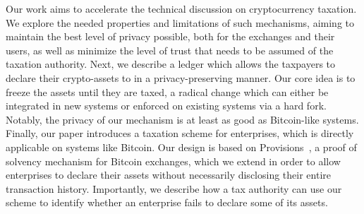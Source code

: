 Our work aims to accelerate the technical discussion on cryptocurrency
taxation.  We explore the needed properties and limitations of such mechanisms,
aiming to maintain the best level of privacy possible, both for the exchanges
and their users, as well as minimize the level of trust that needs to be
assumed of the taxation authority. Next, we describe a ledger which allows
the taxpayers to declare their crypto-assets to in a
privacy-preserving manner. Our core idea is to freeze the assets until they are
taxed, a radical change which can either be integrated in new systems or
enforced on existing systems via a hard fork. Notably, the privacy of our
mechanism is at least as good as Bitcoin-like systems. Finally, our paper
introduces a taxation scheme for enterprises, which is directly applicable on
systems like Bitcoin. Our design is based on Provisions~\cite{CCS:DBBCB15}, a
proof of solvency mechanism for Bitcoin exchanges, which we extend in order to
allow enterprises to declare their assets without necessarily disclosing their
entire transaction history. Importantly, we describe how a tax authority can
use our scheme to identify whether an enterprise fails to declare some of its
assets.
